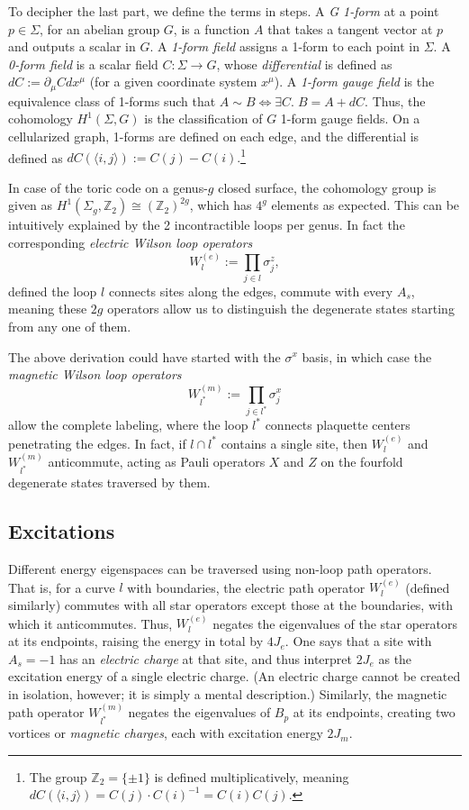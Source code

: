 \documentclass{article}
\begin{document}
To decipher the last part, we define the terms in steps.
A \emph{G 1-form} at a point $p \in \Sigma$, for an abelian group $G$,
is a function $A$ that takes a tangent vector at $p$ and outputs a scalar in $G$.
A \emph{1-form field} assigns a 1-form to each point in $\Sigma$.
A \emph{0-form field} is a scalar field $C : \Sigma \rightarrow G$,
whose \emph{differential} is defined as $dC := \partial_\mu C dx^\mu$ (for a given coordinate system $x^\mu$).
A \emph{1-form gauge field} is the equivalence class of 1-forms such that $A \sim B \iff \exists C.\; B = A + dC$.
Thus, the cohomology $H^1(\Sigma, G)$ is the classification of $G$ 1-form gauge fields.
On a cellularized graph, 1-forms are defined on each edge,
and the differential is defined as $dC(\langle i, j\rangle) := C(j) - C(i).$\footnote{%
The group $\mathbb{Z}_2 = \{\pm 1\}$ is defined multiplicatively, meaning
$dC(\langle i, j\rangle) = C(j) \cdot C(i)^{-1} = C(i) C(j)$.
}

In case of the toric code on a genus-$g$ closed surface,
the cohomology group is given as $H^1(\Sigma_g, \mathbb{Z}_2) \cong (\mathbb{Z}_2)^{2g}$,
which has $4^g$ elements as expected.
This can be intuitively explained by the 2 incontractible loops per genus.
In fact the corresponding \emph{electric Wilson loop operators}
\[
	W_l^{(e)} := \prod_{j \in l} \sigma_j^z,
\]
defined the loop $l$ connects sites along the edges,
commute with every $A_s$, meaning these $2g$ operators allow us
to distinguish the degenerate states starting from any one of them.

The above derivation could have started with the $\sigma^x$ basis,
in which case the \emph{magnetic Wilson loop operators}
\[
	W_{l^*}^{(m)} := \prod_{j \in l^*} \sigma_j^x
\]
allow the complete labeling, where the loop $l^*$ connects plaquette centers penetrating the edges.
In fact, if $l \cap l^*$ contains a single site, then $W_l^{(e)}$ and $W_{l^*}^{(m)}$ anticommute,
acting as Pauli operators $X$ and $Z$ on the fourfold degenerate states traversed by them.

\subsection{Excitations}
Different energy eigenspaces can be traversed using non-loop path operators.
That is, for a curve $l$ with boundaries, the electric path operator $W_l^{(e)}$ (defined similarly)
commutes with all star operators except those at the boundaries, with which it anticommutes.
Thus, $W_l^{(e)}$ negates the eigenvalues of the star operators at its endpoints,
raising the energy in total by $4J_e$.
One says that a site with $A_s = -1$ has an \emph{electric charge} at that site,
and thus interpret $2J_e$ as the excitation energy of a single electric charge.
(An electric charge cannot be created in isolation, however; it is simply a mental description.)
Similarly, the magnetic path operator $W_{l^*}^{(m)}$ negates the eigenvalues of $B_p$ at its endpoints,
creating two vortices or \emph{magnetic charges}, each with excitation energy $2J_m$.
\end{document}
